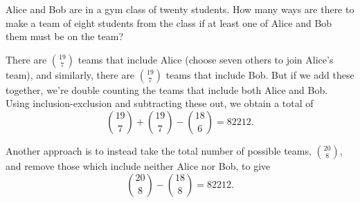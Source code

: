 






\begin{example}
Alice and Bob are in a gym class of twenty students. How many ways are there to make a team of eight students from the class if at least one of Alice and Bob them must be on the team?

There are $\binom{19}{7}$ teams that include Alice (choose seven others to join Alice's team), and similarly, there are $\binom{19}{7}$ teams that include Bob. But if we add these together, we're double counting the teams that include both Alice and Bob. Using inclusion-exclusion and subtracting these out, we obtain a total of
$$\binom{19}{7} + \binom{19}{7} - \binom{18}{6} = 82212.$$

Another approach is to instead take the total number of possible teams, $\binom{20}{8}$, and remove those which include neither Alice nor Bob, to give
$$\binom{20}{8} - \binom{18}{8} = 82212.$$
\end{example}

